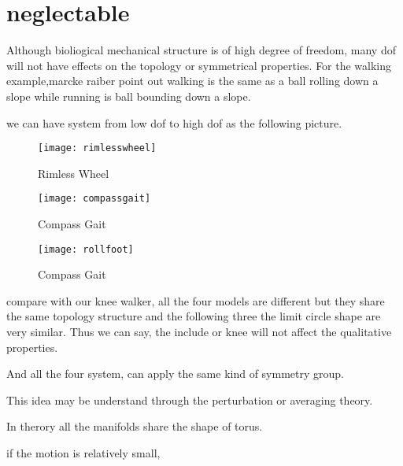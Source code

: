 \section{neglectable}
Although bioliogical mechanical structure is of high degree of freedom, many dof will not have effects on the topology or symmetrical properties.
For the walking example,marcke raiber\citet{Raibert1986} point out walking is the same as a ball rolling down a slope while running is ball bounding down a slope.


we can have system from low dof to high dof as the following picture.
\begin{itemize}
\end{itemize}


\begin{figure}[!htbp]
  \begin{center}
    \texttt{[image: rimlesswheel]}
    \caption{Rimless Wheel}
    \label{fig:rimlesswheel}
\end{center}
\end{figure}


\begin{figure}[!htbp]
  \begin{center}
      \texttt{[image: compassgait]}
    \caption{Compass Gait}
    \label{fig:compassgait}
\end{center}
\end{figure}


\begin{figure}[!htbp]
  \begin{center}
      \texttt{[image: rollfoot]}
    \caption{Compass Gait}
    \label{fig:compassgait}
\end{center}
\end{figure}


compare with our knee walker, all the four models are different but they share the same topology structure and the following three the limit circle shape are very similar.
Thus we can say, the include or knee will not affect the qualitative properties.


And all the four system, can apply the same kind of symmetry group.


This idea may be understand through the perturbation or averaging theory.

In therory all the manifolds share the shape of torus.

if the motion is relatively small,

